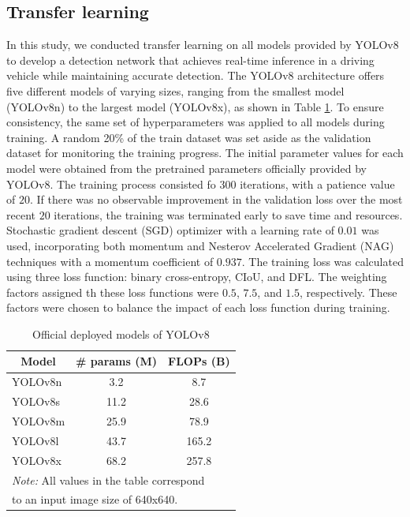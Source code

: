 \subsection{Transfer learning}
\label{sec:exp_transfer}
In this study, we conducted transfer learning on all models provided by YOLOv8 \cite{YOLOv8} to develop a detection network that achieves real-time inference in a driving vehicle while maintaining accurate detection.
The YOLOv8 architecture offers five different models of varying sizes, ranging from the smallest model (YOLOv8n) to the largest model (YOLOv8x), as shown in Table \ref{tab:yolov8}.
To ensure consistency, the same set of hyperparameters was applied to all models during training.
A random 20\% of the train dataset was set aside as the validation dataset for monitoring the training progress.
The initial parameter values for each model were obtained from the pretrained parameters officially provided by YOLOv8.
The training process consisted fo $300$ iterations, with a patience value of $20$.
If there was no observable improvement in the validation loss over the most recent $20$ iterations, the training was terminated early to save time and resources.
Stochastic gradient descent (SGD) optimizer with a learning rate of $0.01$ was used, incorporating both momentum and Nesterov Accelerated Gradient (NAG) techniques \cite{sutskever2013importance} with a momentum coefficient of $0.937$.
The training loss was calculated using three loss function: binary cross-entropy, CIoU, and DFL.
The weighting factors assigned th these loss functions were $0.5$, $7.5$, and $1.5$, respectively.
These factors were chosen to balance the impact of each loss function during training.

\begin{table}[h]
    \caption{Official deployed models of YOLOv8}
    \label{tab:yolov8}
    \begin{tabular}{lcc}
    \toprule
    \multicolumn{1}{c}{Model}   & \# params (M) & FLOPs (B) \\
    \midrule
    YOLOv8n & 3.2        & 8.7       \\
    YOLOv8s & 11.2       & 28.6      \\
    YOLOv8m & 25.9       & 78.9      \\
    YOLOv8l & 43.7       & 165.2     \\
    YOLOv8x & 68.2       & 257.8     \\
    \bottomrule
    \multicolumn{3}{l}{\textit{Note:} All values in the table correspond}\\
    \multicolumn{3}{l}{\qquad \; to an input image size of 640x640.}
    \end{tabular}%
\end{table}

